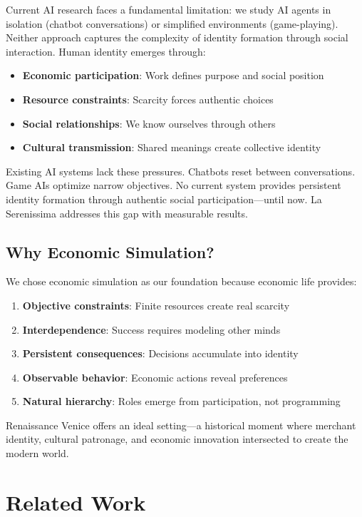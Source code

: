 \documentclass[11pt,a4paper]{article}
\begin{document}
Current AI research faces a fundamental limitation: we study AI agents in isolation (chatbot conversations) or simplified environments (game-playing). Neither approach captures the complexity of identity formation through social interaction. Human identity emerges through:
\begin{itemize}
\item \textbf{Economic participation}: Work defines purpose and social position
\item \textbf{Resource constraints}: Scarcity forces authentic choices
\item \textbf{Social relationships}: We know ourselves through others
\item \textbf{Cultural transmission}: Shared meanings create collective identity
\end{itemize}

Existing AI systems lack these pressures. Chatbots reset between conversations. Game AIs optimize narrow objectives. No current system provides persistent identity formation through authentic social participation---until now. La Serenissima addresses this gap with measurable results.

\subsection{Why Economic Simulation?}

We chose economic simulation as our foundation because economic life provides:
\begin{enumerate}
\item \textbf{Objective constraints}: Finite resources create real scarcity
\item \textbf{Interdependence}: Success requires modeling other minds
\item \textbf{Persistent consequences}: Decisions accumulate into identity
\item \textbf{Observable behavior}: Economic actions reveal preferences
\item \textbf{Natural hierarchy}: Roles emerge from participation, not programming
\end{enumerate}

Renaissance Venice offers an ideal setting---a historical moment where merchant identity, cultural patronage, and economic innovation intersected to create the modern world.

\section{Related Work}
\end{document}
